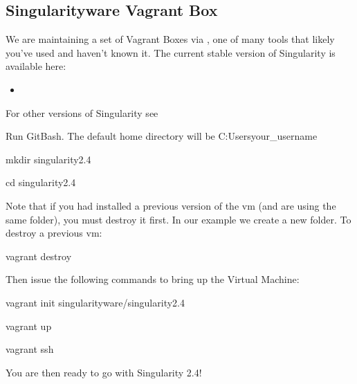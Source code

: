 \documentclass[letterpaper,10pt,english]{sphinxmanual}
\begin{document}
\subsection{Singularityware Vagrant Box}
\label{\detokenize{installation:singularityware-vagrant-box}}
We are maintaining a set of Vagrant Boxes via , one of  many tools that likely you’ve used and haven’t known it. The current stable version of Singularity is available here:
\begin{itemize}
\item {} 

\end{itemize}

For other versions of Singularity see 

Run GitBash. The default home directory will be C:Usersyour\_username

%
\begin{sphinxVerbatim}[commandchars=\\\{\}]
mkdir singularity\PYGZhy{}2.4

cd singularity\PYGZhy{}2.4
\end{sphinxVerbatim}

Note that if you had installed a previous version of the vm (and are using the same folder), you must destroy it first. In our example we create a new folder. To destroy a previous vm:

%
\begin{sphinxVerbatim}[commandchars=\\\{\}]
vagrant destroy
\end{sphinxVerbatim}

Then issue the following commands to bring up the Virtual Machine:

%
\begin{sphinxVerbatim}[commandchars=\\\{\}]
vagrant init singularityware/singularity\PYGZhy{}2.4

vagrant up

vagrant ssh
\end{sphinxVerbatim}

You are then ready to go with Singularity 2.4!
\end{document}

